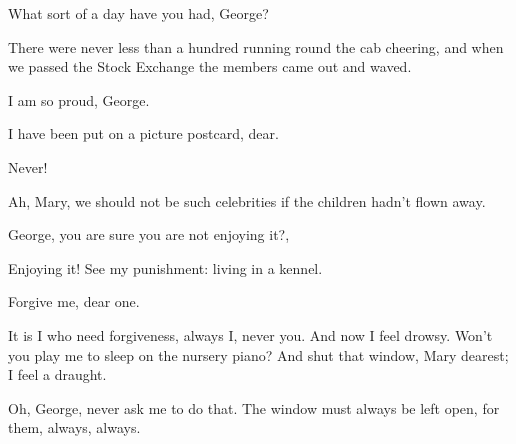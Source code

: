 \begin{drama}
What sort of a day have you had, George?


\mrdarlingspeaks
There were never less than a hundred running round the cab cheering,
and when we passed the Stock Exchange the members came out and waved.


I am so proud, George.

I have been put on a picture postcard, dear.

Never!

Ah, Mary, we should not be such celebrities if the children hadn’t flown away.

George, you are sure you are not enjoying it?,

Enjoying it!
See my punishment: living in a kennel.

\mrsdarlingspeaks
Forgive me, dear one.

\mrdarlingspeaks
It is I who need forgiveness, always I, never you.
And now I feel drowsy.
Won’t you play me to sleep on the nursery piano?
And shut that window, Mary dearest; I feel a draught.

\mrsdarlingspeaks
Oh, George, never ask me to do that.
The window must always be left open, for them, always, always.



\end{drama}
